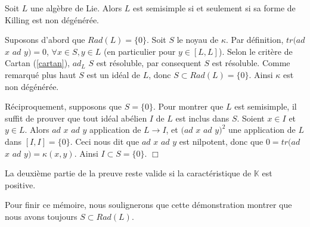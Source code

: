 \documentclass[a4paper,openany,12pt]{report}
\newcommand{\KK}{\mathbb{K}}
\theoremstyle{break}
{\theorembodyfont{\upshape}
\newtheorem*{rmq}{Remarque :}
\newtheorem*{prv}{Preuve :}
\newtheorem*{ex}{Exemples :}
\newtheorem*{exe}{Exemple : }
\newtheorem*{nota}{Notation :}
\newtheorem*{dem}{D\'emonstration :}}
\begin{document}
\begin{thm}
\quad Soit $L$ une algèbre de Lie. Alors $L$ est semisimple si et seulement si sa forme de Killing est non dégénérée. 
\end{thm}

\begin{dem}
\quad Suposons d'abord que $Rad(L) = \{0\}$. Soit $S$ le noyau de $\kappa$. Par définition, $tr(ad$ $x$ $ad$ $y)=0$, $\forall x \in S,y \in L$ (en particulier pour $y \in [L,L]$). Selon le critère de Cartan (\ref{cartan}), $ad_L$ $S$ est résoluble, par consequent $S$ est résoluble. Comme remarqué plus haut $S$ est un idéal de $L$, donc $S \subset Rad(L) = \{0\}$. Ainsi $\kappa$ est non dégénérée. 

Réciproquement, supposons que $S = \{0 \}$. Pour montrer que $L$ est semisimple, il suffit de prouver que tout idéal abélien $I$ de $L$ est inclus dans $S$. Soient $x \in I$ et $y \in L$. Alors $ad$ $x$ $ad$ $y$ application de $L \to I$, et $(ad$ $x$ $ad$ $y)^2$ une application de $L$ dans $[I,I] =\{0\}$. Ceci nous dit que $ad$ $x$ $ad$ $y$ est nilpotent, donc que $0 = tr(ad$ $x$ $ad$ $y)= \kappa(x,y)$. Ainsi $I \subset S = \{0\}$. $\Box$
\end{dem}

\begin{rmq}
\quad La deuxième partie de la preuve reste valide  si la caractéristique de $\KK$ est positive.
\end{rmq}

Pour finir ce mémoire, nous soulignerons que cette démonstration montrer que nous avons toujours $S \subset Rad(L)$. 
\end{document}
